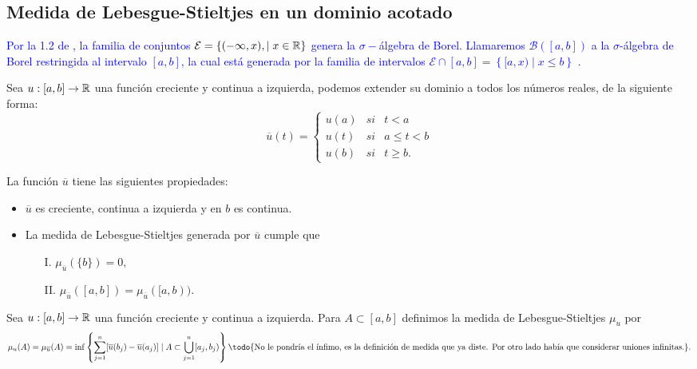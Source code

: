\subsection{Medida de  Lebesgue-Stieltjes en un dominio acotado}

 

\textcolor{blue}{ Por la  1.2 de \cite{folland}, la familia de conjuntos $\mathcal{E}=\{(-\infty,x),\mid x\in\mathbb{R}\}$ genera la $\sigma-$álgebra de Borel. Llamaremos $\mathscr{B}([a,b])$  a la $\sigma$-álgebra de Borel restringida al intervalo $[a,b]$, la cual  está generada por la familia de intervalos $\mathcal{E}\cap [a,b]=\left\lbrace [a,x) \mid x\leq b\right\rbrace $ .}  
 
 
Sea $u:[a,b]\to\mathbb{R}$ una función  creciente y continua a izquierda, podemos extender su dominio a todos los números reales, de la siguiente forma:
$$\overline{u}(t)=\left\lbrace \begin{array}{rll}
	u(a) &si & t<a\\
	u(t) & si & a\leq t < b\\
	u(b)& si & t\geq b.
\end{array}\right. $$ 

    
\begin{obs} La función $\overline{u}$ tiene las siguientes propiedades:
	\begin{itemize}
		\item $\overline{u}$ es creciente, continua a izquierda y en $b$ es continua.
		\item La medida de Lebesgue-Stieltjes generada por $\overline{u}$ cumple que 
		\begin{enumerate}
			\item[I.] $\mu_{\overline{u}}(\{b\})=0,$
			\item[II.] $\mu_{\overline{u}}([a,b])=\mu_{\overline{u}}([a,b)).$
		\end{enumerate}
	\end{itemize}
\end{obs}
\begin{defi}
	Sea $u:[a,b]\to\mathbb{R}$ una función  creciente y continua a izquierda. Para $A\subset[a,b]$  definimos la medida de Lebesgue-Stieltjes $\mu_u$ por 
	\begin{equation*}
	\mu_{u}(A)=\mu_{\overline{u}}(A)=\inf\left\lbrace \sum_{ j=1 }^n[\overline{u}(b_j)-\overline{u}(a_j)] \mid A\subset \bigcup_{j=1}^n[a_j,b_j)\right\rbrace\textrm{\todo{No le pondría el ínfimo, es la definición de medida que ya diste. Por otro lado había que considerar uniones infinitas.}}. 
 \end{equation*}
\end{defi}

